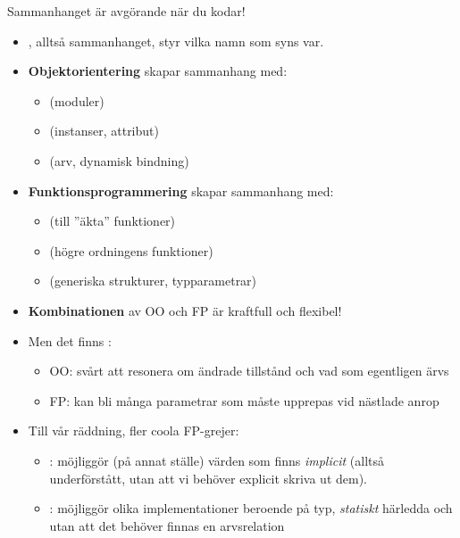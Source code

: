 \begin{Slide}{Sammanhanget är avgörande när du kodar!}
\begin{itemize}\SlideFontSmall
  \item {}, alltså sammanhanget, styr vilka namn som syns var.
  \pause
  \item \textbf{Objektorientering} skapar sammanhang med:
  \begin{itemize}\SlideFontTiny
    \item {} (moduler)
    \item {}  (instanser, attribut)
    \item {} (arv, dynamisk bindning)
  \end{itemize} 
  \pause
  \item \textbf{Funktionsprogrammering} skapar sammanhang med:
  \begin{itemize}\SlideFontTiny
    \item {} (till ''äkta'' funktioner)
    \item {} (högre ordningens funktioner)
    \item {} (generiska strukturer, typparametrar)
  \end{itemize}
  \pause
  \item \textbf{Kombinationen} av OO och FP är  kraftfull och flexibel!
  \pause
  \item Men det finns :
  \begin{itemize}\SlideFontTiny
    \item OO: svårt att resonera om ändrade tillstånd och vad som egentligen ärvs
    \item FP: kan bli många parametrar som måste upprepas vid nästlade anrop
  \end{itemize} 
  \pause
  \item Till vår räddning, fler coola FP-grejer: 
  \begin{itemize}\SlideFontTiny
    \item {}: möjliggör (på annat ställe)  värden som finns \emph{implicit} (alltså underförstått, utan att vi behöver explicit skriva ut dem).
    \item {}: möjliggör olika implementationer beroende på typ, \emph{statiskt} härledda och utan att det behöver finnas en arvsrelation  
  \end{itemize} 
\end{itemize}
\end{Slide}

